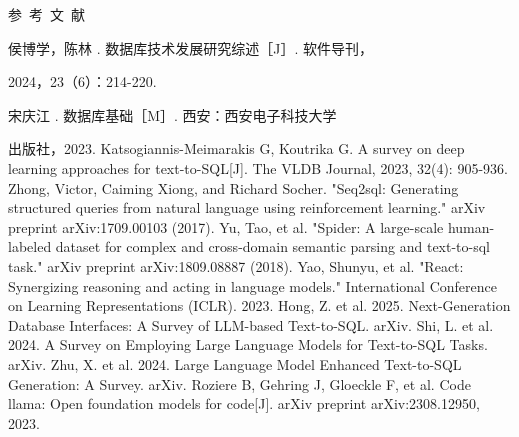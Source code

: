 \documentclass[10.5pt,compsoc,twocolumn]{CjC} %
\theoremstyle{mystyle}
\begin{document}
    
{
\begin{CJK*}{UTF8}{zhhei}参~考~文~献\end{CJK*}}
\begin{thebibliography}{99}
 \addtolength{\itemsep}{-1em}
\vspace {1.5mm}

\begin{CJK*}{UTF8}{song}侯博学，陈林 . 数据库技术发展研究综述［J］. 软件导刊，\end{CJK*}
2024，23（6）：214-220.
 \begin{CJK*}{UTF8}{song}宋庆江 . 数据库基础［M］. 西安：西安电子科技大学\end{CJK*}
出版社，2023.
 Katsogiannis-Meimarakis G, Koutrika G. A survey on deep learning approaches for text-to-SQL[J]. The VLDB Journal, 2023, 32(4): 905-936.
 Zhong, Victor, Caiming Xiong, and Richard Socher. "Seq2sql: Generating structured queries from natural language using reinforcement learning." arXiv preprint arXiv:1709.00103 (2017).
 Yu, Tao, et al. "Spider: A large-scale human-labeled dataset for complex and cross-domain semantic parsing and text-to-sql task." arXiv preprint arXiv:1809.08887 (2018).
 Yao, Shunyu, et al. "React: Synergizing reasoning and acting in language models." International Conference on Learning Representations (ICLR). 2023.
 Hong, Z. et al. 2025. Next-Generation Database Interfaces: A Survey of LLM-based Text-to-SQL. arXiv.
 Shi, L. et al. 2024. A Survey on Employing Large Language Models for Text-to-SQL Tasks. arXiv.
Zhu, X. et al. 2024. Large Language Model Enhanced Text-to-SQL Generation: A Survey. arXiv.
 Roziere B, Gehring J, Gloeckle F, et al. Code llama: Open foundation models for code[J]. arXiv preprint arXiv:2308.12950, 2023.


\end{thebibliography}
\end{document}
